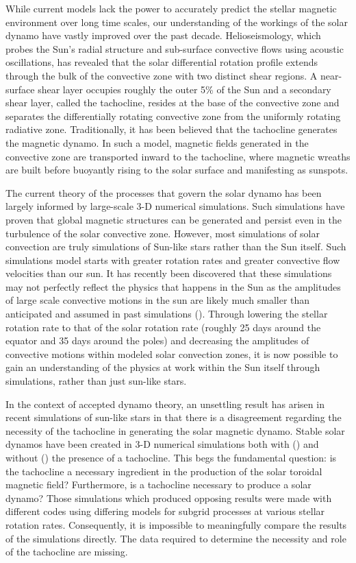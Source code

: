 \documentclass[aasms,12pt]{article}
\begin{document}
While current models lack the power to accurately 
predict the stellar magnetic environment 
over long time scales, our understanding of the workings of the solar dynamo 
have
vastly improved over the past decade.  Helioseismology, which probes the Sun's
radial structure and sub-surface convective flows using acoustic oscillations,
has revealed that the solar differential rotation profile extends through the
bulk of the convective zone with two distinct shear regions.  A near-surface
shear layer occupies roughly the outer 5\% of the Sun and a secondary shear
layer, called the tachocline, resides at the base of the convective zone
and separates the differentially rotating convective zone from the uniformly
rotating radiative zone.  Traditionally, it has been believed that the
tachocline generates the magnetic dynamo.  In such a model,
magnetic fields generated
in the convective zone are transported inward to the tachocline, where
magnetic wreaths are built before buoyantly 
rising to the solar surface and manifesting as sunspots.

The current theory of the processes that govern the solar dynamo has been
largely informed by large-scale 3-D numerical simulations.  Such simulations
have proven that global magnetic structures can be generated and persist 
even in the turbulence of the solar convective zone.  However, most simulations
of solar convection are truly simulations of Sun-like stars rather than the Sun
itself.  Such simulations model starts with greater rotation rates and greater
convective flow velocities than our sun.  
It has recently been discovered
that these simulations may not perfectly reflect the physics that happens
in the Sun as the amplitudes of large scale convective motions in the sun are
likely much smaller than anticipated and assumed in past simulations
(\citealt{lord2014}).  
Through lowering the stellar rotation rate to that of the solar rotation rate
(roughly 25 days around the equator and 35 days around the poles)
and decreasing the amplitudes of convective motions within modeled solar
convection zones, it is now possible to gain an understanding of the physics at
work within the Sun itself through simulations, rather than just sun-like
stars.

In the context of accepted dynamo theory, an unsettling result has arisen
in recent simulations of sun-like stars in that there is a disagreement
regarding the necessity of the tachocline
in generating the solar magnetic dynamo.  Stable solar dynamos have been
created in 3-D numerical simulations both with 
(\citealt{ghizaru2010, racine2011})
and without (\citealt{brown2011, nelson2013}) the presence of a tachocline. This
begs the fundamental question: is the tachocline a necessary ingredient in the
production of the solar toroidal magnetic field?  Furthermore, is a tachocline
necessary to produce a solar dynamo?  Those simulations which produced opposing
results were made with different codes using differing models for subgrid
processes at various stellar rotation rates.  Consequently, it is impossible to
meaningfully compare the results of the simulations directly.  The data required
to determine the necessity and role of the tachocline are missing.
\end{document}
